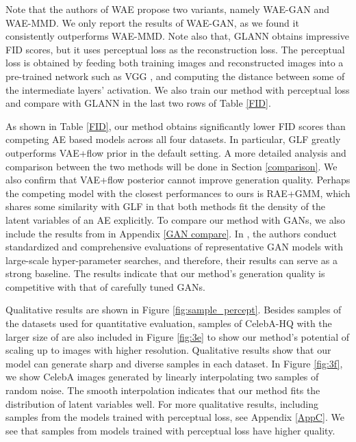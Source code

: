 \documentclass{article}
\begin{document}
Note that the authors of WAE propose two variants, namely WAE-GAN and WAE-MMD. We only report the results of WAE-GAN, as we found it consistently outperforms WAE-MMD. Note also that, GLANN \citep{NAIS} obtains impressive FID scores, but it uses perceptual loss \citep{perceptual} as the reconstruction loss. The perceptual loss is obtained by feeding both training images and reconstructed images into a pre-trained network such as VGG \citep{VGG}, and computing the  distance between some of the intermediate layers' activation. We also train our method with perceptual loss and compare with GLANN in the last two rows of Table \ref{FID}.

As shown in Table \ref{FID}, our method obtains significantly lower FID scores than competing AE based models across all four datasets. In particular, GLF greatly outperforms VAE+flow prior in the default setting. A more detailed analysis and comparison between the two methods will be done in Section \ref{comparison}. We also confirm that VAE+flow posterior cannot improve generation quality. Perhaps the competing model with the closest performances to ours is RAE+GMM, which shares some similarity with GLF in that both methods fit the density of the latent variables of an AE explicitly. To compare our method with GANs, we also include the results from \citep{AreGan} in Appendix \ref{GAN compare}. In \citep{AreGan}, the authors conduct standardized and comprehensive evaluations of representative GAN models with large-scale hyper-parameter searches, and therefore, their results can serve as a strong baseline. The results indicate that our method's generation quality is competitive with that of carefully tuned GANs. 


Qualitative results are shown in Figure \ref{fig:sample_percept}. Besides samples of the datasets used for quantitative evaluation, samples of CelebA-HQ \citep{celebahq} with the larger size of  are also included in Figure \ref{fig:3e} to show our method's potential of scaling up to images with higher resolution. Qualitative results show that our model can generate sharp and diverse samples in each dataset. In Figure \ref{fig:3f}, we show CelebA images generated by linearly interpolating two samples of random noise. The smooth interpolation indicates that our method fits the distribution of latent variables well. For more qualitative results, including samples from the models trained with perceptual loss, see Appendix \ref{AppC}. We see that samples from models trained with perceptual loss have higher quality.
\end{document}
